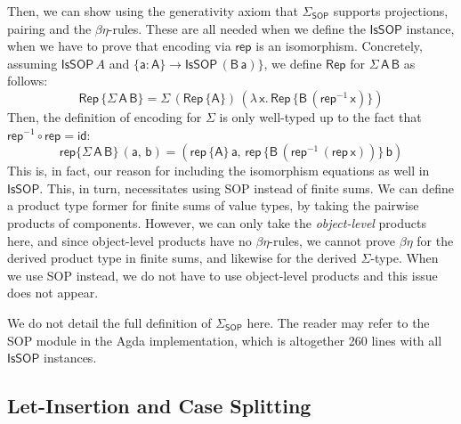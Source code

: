 \documentclass[acmsmall,screen,review,anonymous]{acmart}
\newcommand{\mit}[1]{{\mathsf{#1}}}
\newcommand{\msf}[1]{{\mathsf{#1}}}
\newcommand{\lam}{\lambda\,}
\newcommand{\vA}{\mathsf{A}}
\newcommand{\vB}{\mathsf{B}}
\newcommand{\va}{\mathsf{a}}
\newcommand{\vb}{\mathsf{b}}
\newcommand{\vx}{\mathsf{x}}
\newcommand{\SOP}{\msf{SOP}}
\newcommand{\IsSOP}{\msf{IsSOP}}
\newcommand{\rep}{\msf{rep}}
\theoremstyle{remark}
\newcommand{\id}{\mit{id}}
\newcommand{\Rep}{\mit{Rep}}
\begin{document}
Then, we can show using the generativity axiom that $\Sigma_\SOP$ supports
projections, pairing and the $\beta\eta$-rules. These are all needed when we
define the $\IsSOP$ instance, when we have to prove that encoding via $\rep$
is an isomorphism. Concretely, assuming $\IsSOP\,A$ and $\{\va : \vA\} \to
\IsSOP\,(\vB\,\va)\}$, we define $\Rep$ for $\Sigma\,\vA\,\vB$ as follows:
\[ \Rep\,\{\Sigma\,\vA\,\vB\} = \Sigma\,(\Rep\,\{\vA\})\,(\lam \vx.\,\Rep\,\{\vB\,(\rep^{-1}\,\vx)\}) \]
Then, the definition of encoding for $\Sigma$ is only well-typed up to the fact
that $\rep^{-1} \circ \rep = \id$:
\[  \rep\{\Sigma\,\vA\,\vB\}\,(\va,\,\vb) = (\rep\,\{\vA\}\,\va,\,\rep\,\{\vB\,(\rep^{-1}\,(\rep\,\vx))\}\,\vb) \]
This is, in fact, our reason for including the isomorphism equations as well in
$\IsSOP$. This, in turn, necessitates using SOP instead of finite sums. We can
define a product type former for finite sums of value types, by taking the
pairwise products of components. However, we can only take the
\emph{object-level} products here, and since object-level products have no
$\beta\eta$-rules, we cannot prove $\beta\eta$ for the derived product type in
finite sums, and likewise for the derived $\Sigma$-type. When we use SOP
instead, we do not have to use object-level products and this issue does not
appear.

We do not detail the full definition of $\Sigma_\SOP$ here. The reader may refer
to the SOP module in the Agda implementation, which is altogether 260 lines with
all $\IsSOP$ instances.

\subsection{Let-Insertion and Case Splitting}
\end{document}
